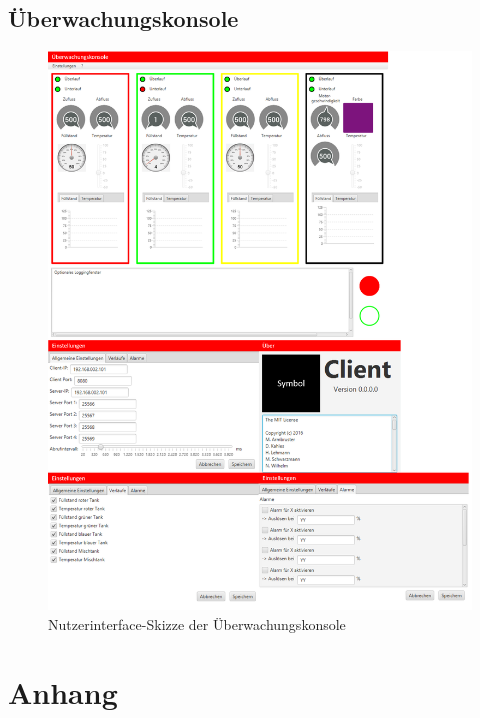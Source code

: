 \documentclass[parskip=full]{scrartcl}
\begin{document}
\subsection{Überwachungskonsole}
\begin{figure}[h]
  \centering
  \includegraphics[scale=0.45]{media/ui-client.png}
  \caption{Nutzerinterface-Skizze der Überwachungskonsole}
\end{figure}
\pagebreak

\section{Anhang}
\end{document}
